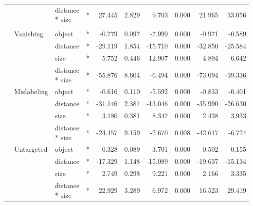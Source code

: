 \begin{longtable}[t]{llllrrrrrr}
\cmidrule{3-10}\nopagebreak
\hspace{1em} &  & distance * size & * & 27.445 & 2.829 & 9.703 & 0.000 & 21.965 & 33.056\\
\cmidrule{1-10}\pagebreak[0]
\addlinespace[0.3em]
\multicolumn{10}{l}{\textbf{Cascade R-CNN}}\\
\hspace{1em} & Vanishing & object & * & -0.779 & 0.097 & -7.999 & 0.000 & -0.971 & -0.589\\
\cmidrule{3-10}\nopagebreak
\hspace{1em} &  & distance & * & -29.119 & 1.854 & -15.710 & 0.000 & -32.850 & -25.584\\
\cmidrule{3-10}\nopagebreak
\hspace{1em} &  & size & * & 5.752 & 0.446 & 12.907 & 0.000 & 4.894 & 6.642\\
\cmidrule{3-10}\nopagebreak
\hspace{1em} &  & distance * size & * & -55.876 & 8.604 & -6.494 & 0.000 & -73.094 & -39.336\\
\cmidrule{2-10}\nopagebreak
\hspace{1em} & Mislabeling & object & * & -0.616 & 0.110 & -5.592 & 0.000 & -0.833 & -0.401\\
\cmidrule{3-10}\nopagebreak
\hspace{1em} &  & distance & * & -31.146 & 2.387 & -13.046 & 0.000 & -35.990 & -26.630\\
\cmidrule{3-10}\nopagebreak
\hspace{1em} &  & size & * & 3.180 & 0.381 & 8.347 & 0.000 & 2.438 & 3.933\\
\cmidrule{3-10}\nopagebreak
\hspace{1em} &  & distance * size & * & -24.457 & 9.159 & -2.670 & 0.008 & -42.647 & -6.724\\
\cmidrule{2-10}\nopagebreak
\hspace{1em} & Untargeted & object & * & -0.328 & 0.089 & -3.701 & 0.000 & -0.502 & -0.155\\
\cmidrule{3-10}\nopagebreak
\hspace{1em} &  & distance & * & -17.329 & 1.148 & -15.089 & 0.000 & -19.637 & -15.134\\
\cmidrule{3-10}\nopagebreak
\hspace{1em} &  & size & * & 2.749 & 0.298 & 9.221 & 0.000 & 2.166 & 3.335\\
\cmidrule{3-10}\nopagebreak
\hspace{1em} &  & distance * size & * & 22.929 & 3.289 & 6.972 & 0.000 & 16.523 & 29.419\\
\bottomrule
\end{longtable}
\endgroup{}

